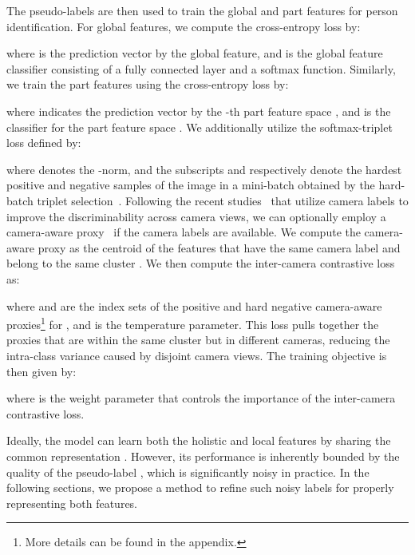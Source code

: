 \documentclass[10pt,twocolumn,letterpaper]{article}
\begin{document}
    The pseudo-labels are then used to train the global and part features for person identification.
    For global features, we compute the cross-entropy loss by:
    
    where  is the prediction vector by the global feature, and  is the global feature classifier consisting of a fully connected layer and a softmax function.
    Similarly, we train the part features using the cross-entropy loss by:
    
    where  indicates the prediction vector by the -th part feature space , and  is the classifier for the part feature space .
    We additionally utilize the softmax-triplet loss defined by:
    
    where  denotes the -norm, and the subscripts  and  respectively denote the hardest positive and negative samples of the image  in a mini-batch obtained by the hard-batch triplet selection~\cite{hermans2017defense}.
    Following the recent studies~\cite{chen2021ice, xuan2021intra} that utilize camera labels to improve the discriminability across camera views, we can optionally employ a camera-aware proxy~\cite{wang2021camera} if the camera labels are available.
    We compute the camera-aware proxy  as the centroid of the features that have the same camera label  and belong to the same cluster .
    We then compute the inter-camera contrastive loss~\cite{wang2021camera} as:
    
    where  and  are the index sets of the positive and hard negative camera-aware proxies{\footnote{More details can be found in the appendix.}} for , and  is the temperature parameter.
    This loss pulls together the proxies that are within the same cluster but in different cameras, reducing the intra-class variance caused by disjoint camera views.
    The training objective is then given by:
    
    where  is the weight parameter that controls the importance of the inter-camera contrastive loss.
    
    Ideally, the model can learn both the holistic and local features by sharing the common representation .
    However, its performance is inherently bounded by the quality of the pseudo-label , which is significantly noisy in practice.
    In the following sections, we propose a method to refine such noisy labels for properly representing both features.
    
\end{document}
